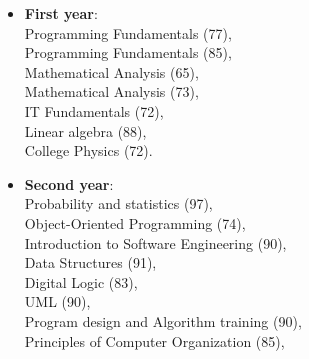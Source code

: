 %
%



\begin{itemize}
	\item \textbf{First year}: \\
		\hspace*{2em}Programming Fundamentals \uppercase\expandafter{} (77), \\
		\hspace*{2em}Programming Fundamentals \uppercase\expandafter{} (85), \\
		\hspace*{2em}Mathematical Analysis \uppercase\expandafter{} (65), \\
		\hspace*{2em}Mathematical Analysis \uppercase\expandafter{} (73), \\
		\hspace*{2em}IT Fundamentals (72), \\
		\hspace*{2em}Linear algebra (88), \\
		\hspace*{2em}College Physics (72).\\
	\item \textbf{Second year}:\\
		\hspace*{2em}Probability and statistics (97), \\
		\hspace*{2em}Object-Oriented Programming (74), \\
		\hspace*{2em}Introduction to Software Engineering (90),\\
		\hspace*{2em}Data Structures (91), \\
		\hspace*{2em}Digital Logic (83), \\
		\hspace*{2em}UML (90), \\
		\hspace*{2em}Program design and Algorithm training (90), \\
		\hspace*{2em}Principles of Computer Organization (85), \\

\end{itemize}
